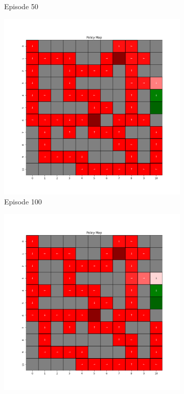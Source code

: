 \documentclass{assignment}
\begin{document}
\begin{figure}[H]
\begin{subfigure}{0.3\textwidth}
    \caption{Episode 50}
    \end{subfigure}\hfill
    \begin{subfigure}{0.3\textwidth}
        \includegraphics[width=\textwidth]{figures/policy_q/gamma_sweep/policy_alpha_0.1_gamma_0.5_epsilon_0.2_iteration_100.png}
    \caption{Episode 100}
    \end{subfigure}
    \begin{subfigure}{0.3\textwidth}
        \includegraphics[width=\textwidth]{figures/policy_q/gamma_sweep/policy_alpha_0.1_gamma_0.5_epsilon_0.2_iteration_1000.png}

\end{subfigure}
\end{figure}
\end{document}
